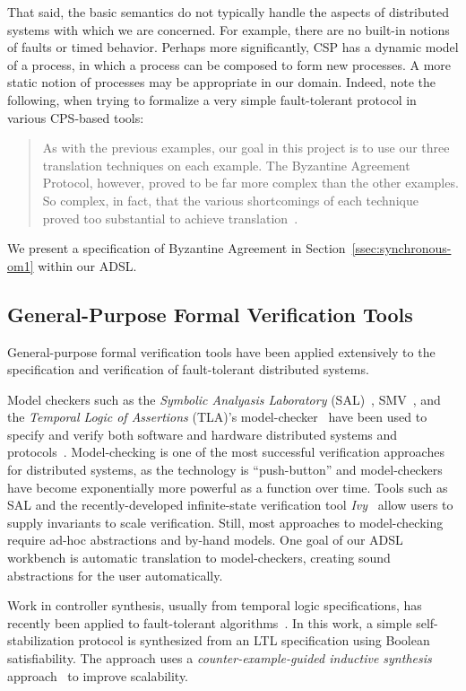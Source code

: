 That said, the basic semantics do not typically handle the aspects of distributed systems
with which we are concerned. For example, there are no built-in notions of
faults or timed behavior. Perhaps more significantly, CSP has a dynamic
model of a process, in which a process can be composed to form new processes. A
more static notion of processes may be appropriate in our domain. Indeed, note
the following, when trying to formalize a very simple fault-tolerant protocol in
various CPS-based tools:

\begin{quote}
As with the previous examples, our goal in this project is to use our three
translation techniques on each example. The Byzantine Agreement Protocol,
however, proved to be far more complex than the other examples. So complex, in
fact, that the various shortcomings of each technique proved too substantial to
achieve translation~\cite{csp-masters}.
\end{quote}
\noindent
We present a specification of Byzantine Agreement in Section~\ref{ssec:synchronous-om1} within our ADSL.

\subsection{General-Purpose Formal Verification Tools}
General-purpose formal verification tools have been applied extensively to the specification and verification of fault-tolerant distributed systems.

Model checkers such as the \emph{Symbolic Analyasis Laboratory}
(SAL)~\cite{SRI:SAL}, SMV~\cite{nusmv}, and the \emph{Temporal Logic of
  Assertions} (TLA)'s model-checker~\cite{tla} have been used to specify and
verify both software and hardware distributed systems and
protocols~\cite{Rushby-OM1,pike-afm,brown_pike_06,pike_johnson:emsoft,amazon-tla,Dutertre-Sorea-2004}. Model-checking
is one of the most successful verification approaches for distributed systems,
as the technology is ``push-button'' and model-checkers have become
exponentially more powerful as a function over time. Tools such as SAL and the recently-developed infinite-state verification tool \emph{Ivy}~\cite{ivy} allow users to supply invariants to scale verification. Still, most approaches to
model-checking require ad-hoc abstractions and by-hand models. One goal of our
ADSL workbench is automatic translation to model-checkers, creating sound
abstractions for the user automatically.

Work in controller synthesis, usually from temporal logic specifications, has
recently been applied to fault-tolerant algorithms~\cite{BloemBJ16}. In this
work, a simple self-stabilization protocol is synthesized from an LTL
specification using Boolean satisfiability. The approach uses a \emph{counter-example-guided inductive
  synthesis} approach~\cite{Solar} to improve scalability.

